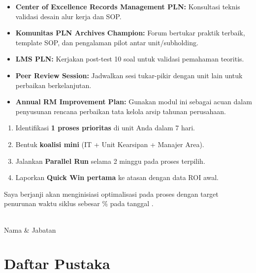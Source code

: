 \documentclass[11pt,a4paper]{article}
\begin{document}
\begin{itemize}
    \item \textbf{Center of Excellence Records Management PLN:} Konsultasi teknis validasi desain alur kerja dan SOP.
    \item \textbf{Komunitas PLN Archives Champion:} Forum bertukar praktik terbaik, template SOP, dan pengalaman pilot antar unit/subholding.
    \item \textbf{LMS PLN:} Kerjakan post-test 10 soal untuk validasi pemahaman teoritis.
    \item \textbf{Peer Review Session:} Jadwalkan sesi tukar-pikir dengan unit lain untuk perbaikan berkelanjutan.
    \item \textbf{Annual RM Improvement Plan:} Gunakan modul ini sebagai acuan dalam penyusunan rencana perbaikan tata kelola arsip tahunan perusahaan.
\end{itemize}

\begin{actionbox}
\begin{enumerate}[nosep]
    \item Identifikasi \textbf{1 proses prioritas} di unit Anda dalam 7 hari.
    \item Bentuk \textbf{koalisi mini} (IT + Unit Kearsipan + Manajer Area).
    \item Jalankan \textbf{Parallel Run} selama 2 minggu pada proses terpilih.
    \item Laporkan \textbf{Quick Win pertama} ke atasan dengan data ROI awal.
\end{enumerate}
\end{actionbox}

\vspace{0.8cm}
\begin{standardbox}
Saya berjanji akan menginisiasi optimalisasi pada proses \dotfill dengan target penurunan waktu siklus sebesar \dotfill \% pada tanggal \dotfill.

\vspace{0.8cm}
\begin{flushright}
\begin{minipage}{0.5\textwidth}
\centering
\dotfill\\
Nama \& Jabatan
\end{minipage}
\end{flushright}
\end{standardbox}

\newpage
\section*{Daftar Pustaka}
\end{document}
